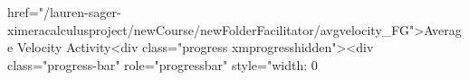href="/lauren-sager-ximeracalculusproject/newCourse/newFolderFacilitator/avgvelocity_FG">Average Velocity Activity<div class="progress xmprogresshidden"><div class="progress-bar" role="progressbar" style="width: 0%